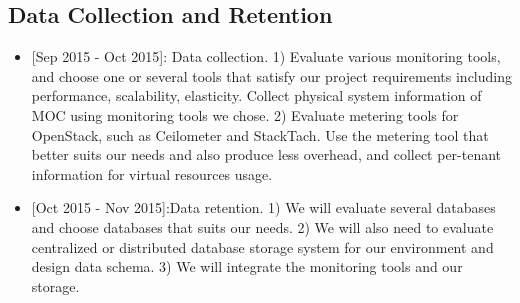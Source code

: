 \subsection{Data Collection and Retention}

\begin{itemize}
\item{[Sep 2015 - Oct 2015]:} Data collection. 1) Evaluate various monitoring tools, and choose one or several tools that satisfy our project requirements including performance, scalability, elasticity. Collect physical system information of MOC using monitoring tools we chose. 2) Evaluate metering tools for OpenStack, such as Ceilometer and StackTach. Use the metering tool that better suits our needs and also produce less overhead, and collect per-tenant information for virtual resources usage. 
\item{[Oct 2015 - Nov 2015]:}Data retention. 1) We will evaluate several databases and choose databases that suits our needs. 2) We will also need to evaluate centralized or distributed database storage system for our environment and design data schema. 3) We will integrate the monitoring tools and our storage.
\end{itemize}